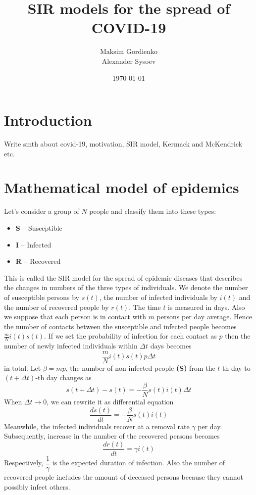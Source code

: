 \documentclass[12pt, a4paper]{article}
\title{SIR models for the spread of COVID-19}
\date{\today}
\author{
	Maksim Gordienko \\
	Alexander Sysoev
}
\begin{document}
	\maketitle
	
	\section{Introduction}
	Write smth about covid-19, motivation, SIR model, Kermack
	and McKendrick etc.
	
	\section{Mathematical model of epidemics}
	Let's consider a group of $N$ people and classify them into these types:
	\begin{itemize}
		\item \textbf{S} -- Susceptible
		\item \textbf{I} -- Infected
		\item \textbf{R} -- Recovered
	\end{itemize}

	This is called the SIR model for the spread of epidemic diseases that describes the changes in numbers of the three types of individuals. We denote the number of susceptible persons by $s(t)$, the number of infected individuals by $i(t)$ and the number of recovered people by $r(t)$. The time $t$ is measured in days. Also we suppose that each person is in contact with $m$ persons per day average. Hence the number of contacts between the susceptible and infected people becomes $\frac{m}{N} i(t) s(t)$. If we set the probability of infection for each contact as $p$ then the number of newly infected individuals within $\Delta t$ days becomes
	\begin{equation}
		\frac{m}{N} i(t) s(t) p \Delta t
	\end{equation}
	in total. Let $\beta = mp$, the number of non-infected people \textbf{(S)} from the $t$-th day to $ (t + \Delta t) $-th day changes as
	\begin{equation}
		s(t + \Delta t) - s(t) = - \frac{\beta}{N} s(t) i(t) \Delta t
	\end{equation}
	When $\Delta t \rightarrow 0 $, we can rewrite it as differential equation
	\begin{equation}
		\frac{ds(t)}{dt} = - \frac{\beta}{N} s(t) i(t)
	\end{equation}
	Meanwhile, the infected individuals recover at a removal rate $ \gamma $ per day. Subsequently, increase in the number of the recovered persons becomes
	\begin{equation}
		\frac{dr(t)}{dt} = \gamma i(t)
	\end{equation}
	Respectively, $ \dfrac{1}{\gamma} $ is the expected duration of infection. Also the number of recovered people includes the amount of deceased persons because they cannot possibly infect others.
	
\end{document}
